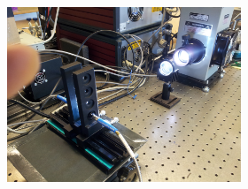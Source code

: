 \documentclass[webedition,openright,titles,swedish,english]{LuaUUThesis}\usepackage[]{graphicx}\usepackage[]{xcolor}
\begin{document}
\begin{figure}[tbp]
\begin{subfigure}[T]{0.32\textwidth}
\begin{subfigure}{\linewidth}
      \caption{}
      \label{fig:0400-pc-solarsimulator-thinfilm}
   \end{subfigure}%
   \\[3.70pt]%
   \begin{subfigure}{\linewidth}
      \includegraphics[trim={160mm 80mm 0 60mm},clip,width=\linewidth]{methods/photocatalysis/0424130001.jpg}
      \caption{}

\end{subfigure}
\end{subfigure}
\end{figure}
\end{document}

